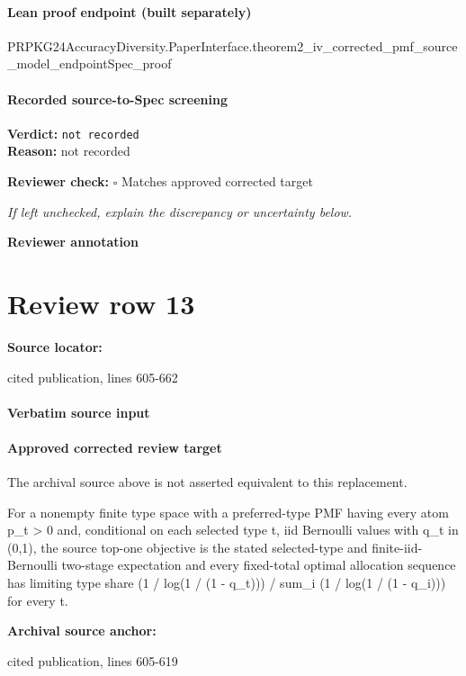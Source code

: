 \documentclass[10pt]{article}
\newcommand{\reviewerbox}{%
  \par\noindent\fbox{\parbox{0.96\linewidth}{\rule{0pt}{0.38in}}}\par
}
\newcommand{\reviewmatch}[1]{%
  \par\noindent\textbf{Reviewer check:} $\square$\; #1\par
  \noindent\emph{If left unchecked, explain the discrepancy or uncertainty below.}\par
}
\begin{document}
\paragraph{Lean proof endpoint (built separately)}\begin{ReviewVerbatim}
PRPKG24AccuracyDiversity.PaperInterface.theorem2_iv_corrected_pmf_source_model_endpointSpec_proof
\end{ReviewVerbatim}

\paragraph{Recorded source-to-Spec screening}
\textbf{Verdict:} \texttt{not recorded}
\\
\textbf{Reason:} not recorded
\reviewmatch{Matches approved corrected target}
\noindent\textbf{Reviewer annotation}\par
\reviewerbox
\clearpage
\hypertarget{source-claim-149ee4bef168eff6}{}
\section*{Review row 13}
\textbf{Source locator:} {\footnotesize\raggedright cited publication, lines 605-\allowbreak{}662\par}
\paragraph{Verbatim source input}
\begin{ReviewVerbatim}
\end{ReviewVerbatim}

\paragraph{Approved corrected review target}
The archival source above is not asserted equivalent to this replacement.
\begin{ReviewVerbatim}
For a nonempty finite type space with a preferred-type PMF having every atom p_t > 0 and, conditional on each selected type t, iid Bernoulli values with q_t in (0,1), the source top-one objective is the stated selected-type and finite-iid-Bernoulli two-stage expectation and every fixed-total optimal allocation sequence has limiting type share (1 / log(1 / (1 - q_t))) / sum_i (1 / log(1 / (1 - q_i))) for every t.
\end{ReviewVerbatim}

\textbf{Archival source anchor:} {\footnotesize\raggedright cited publication, lines 605-\allowbreak{}619\par}
\end{document}

